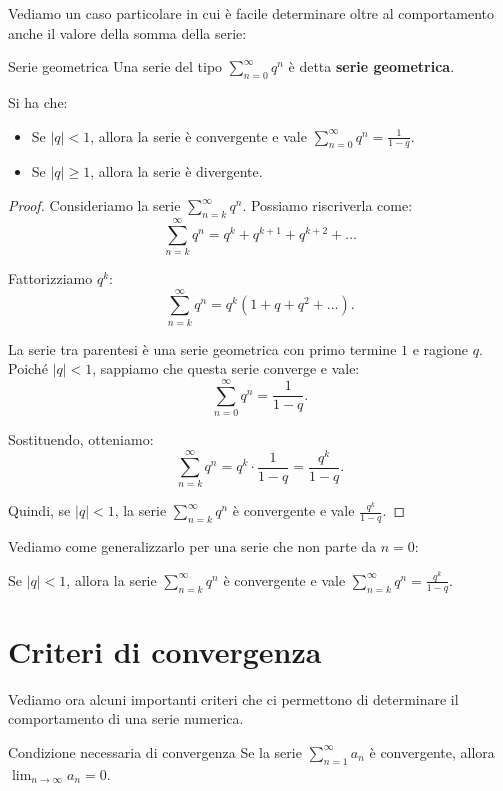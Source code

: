 Vediamo un caso particolare in cui è facile determinare oltre al comportamento anche il valore della somma della serie:
\begin{definizione}{Serie geometrica}
  Una serie del tipo $\sum_{n=0}^{\infty} q^n$ è detta \textbf{serie geometrica}.\\
\end{definizione}
\begin{teorema}{}
  Si ha che:
  \begin{itemize}
    \item Se $|q| < 1$, allora la serie è convergente e vale $\sum_{n=0}^{\infty} q^n = \frac{1}{1-q}$.
    \item Se $|q| \geq 1$, allora la serie è divergente.
  \end{itemize}
\end{teorema}

\begin{proof}
  Consideriamo la serie $\sum_{n=k}^{\infty} q^n$. Possiamo riscriverla come:
  \[
  \sum_{n=k}^{\infty} q^n = q^k + q^{k+1} + q^{k+2} + \dots
  \]

  Fattorizziamo $q^k$:
  \[
  \sum_{n=k}^{\infty} q^n = q^k \left( 1 + q + q^2 + \dots \right).
  \]

  La serie tra parentesi è una serie geometrica con primo termine $1$ e ragione $q$. Poiché $|q| < 1$, sappiamo che questa serie converge e vale:
  \[
  \sum_{n=0}^{\infty} q^n = \frac{1}{1-q}.
  \]

  Sostituendo, otteniamo:
  \[
  \sum_{n=k}^{\infty} q^n = q^k \cdot \frac{1}{1-q} = \frac{q^k}{1-q}.
  \]

  Quindi, se $|q| < 1$, la serie $\sum_{n=k}^{\infty} q^n$ è convergente e vale $\frac{q^k}{1-q}$.
\end{proof}

Vediamo come generalizzarlo per una serie che non parte da $n=0$:
\begin{osservazione}{}
  Se $|q| < 1$, allora la serie $\sum_{n=k}^{\infty} q^n$ è convergente e vale $\sum_{n=k}^{\infty} q^n = \frac{q^k}{1-q}$.
\end{osservazione}

\section{Criteri di convergenza}
Vediamo ora alcuni importanti criteri che ci permettono di determinare il comportamento di una serie numerica.
\begin{teorema}{Condizione necessaria di convergenza}
  Se la serie $\sum_{n=1}^{\infty} a_n$ è convergente, allora $\lim_{n \to \infty} a_n = 0$.
\end{teorema}

